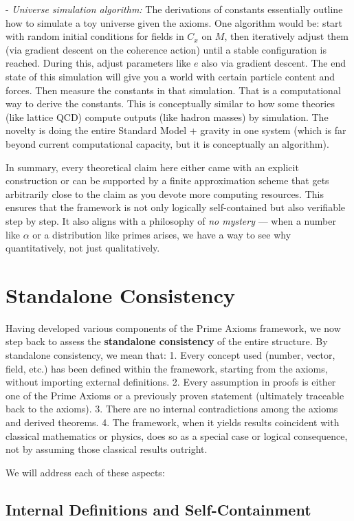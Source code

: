 \documentclass[11pt]{article}
\begin{document}
- \emph{Universe simulation algorithm:} The derivations of constants essentially outline how to simulate a toy universe given the axioms. One algorithm would be: start with random initial conditions for fields in $C_x$ on $M$, then iteratively adjust them (via gradient descent on the coherence action) until a stable configuration is reached. During this, adjust parameters like $e$ also via gradient descent. The end state of this simulation will give you a world with certain particle content and forces. Then measure the constants in that simulation. That is a computational way to derive the constants. This is conceptually similar to how some theories (like lattice QCD) compute outputs (like hadron masses) by simulation. The novelty is doing the entire Standard Model + gravity in one system (which is far beyond current computational capacity, but it is conceptually an algorithm).

In summary, every theoretical claim here either came with an explicit construction or can be supported by a finite approximation scheme that gets arbitrarily close to the claim as you devote more computing resources. This ensures that the framework is not only logically self-contained but also verifiable step by step. It also aligns with a philosophy of \emph{no mystery} — when a number like $\alpha$ or a distribution like primes arises, we have a way to see why quantitatively, not just qualitatively.

\section{Standalone Consistency}

Having developed various components of the Prime Axioms framework, we now step back to assess the \textbf{standalone consistency} of the entire structure. By standalone consistency, we mean that:
1. Every concept used (number, vector, field, etc.) has been defined within the framework, starting from the axioms, without importing external definitions.
2. Every assumption in proofs is either one of the Prime Axioms or a previously proven statement (ultimately traceable back to the axioms).
3. There are no internal contradictions among the axioms and derived theorems.
4. The framework, when it yields results coincident with classical mathematics or physics, does so as a special case or logical consequence, not by assuming those classical results outright.

We will address each of these aspects:

\subsection*{Internal Definitions and Self-Containment}
\end{document}
